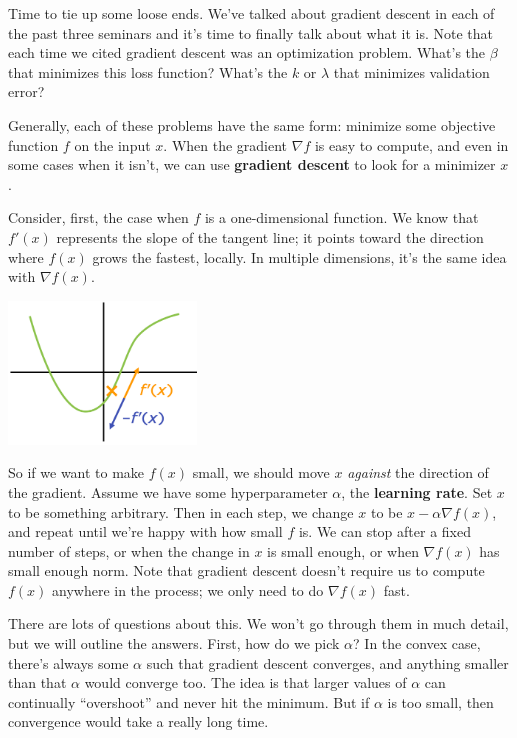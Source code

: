 \documentclass[11pt,paper=letter]{scrartcl}
\begin{document}
Time to tie up some loose ends. We've talked about gradient descent in each of the past three seminars and it's time to finally talk about what it is. Note that each time we cited gradient descent was an optimization problem. What's the $\beta$ that minimizes this loss function? What's the $k$ or $\lambda$ that minimizes validation error?

Generally, each of these problems have the same form: minimize some objective function $f$ on the input $x$. When the gradient $\nabla f$ is easy to compute, and even in some cases when it isn't, we can use \textbf{gradient descent} to look for a minimizer $x$.

Consider, first, the case when $f$ is a one-dimensional function. We know that $f'(x)$ represents the slope of the tangent line; it points toward the direction where $f(x)$ grows the fastest, locally. In multiple dimensions, it's the same idea with $\nabla f(x)$.

\begin{center}
  \includegraphics[height=1.5in]{23.png}
\end{center}

So if we want to make $f(x)$ small, we should move $x$ \textit{against} the direction of the gradient. Assume we have some hyperparameter $\alpha$, the \textbf{learning rate}. Set $x$ to be something arbitrary. Then in each step, we change $x$ to be $x - \alpha \nabla f(x)$, and repeat until we're happy with how small $f$ is. We can stop after a fixed number of steps, or when the change in $x$ is small enough, or when $\nabla f(x)$ has small enough norm. Note that gradient descent doesn't require us to compute $f(x)$ anywhere in the process; we only need to do $\nabla f(x)$ fast.

There are lots of questions about this. We won't go through them in much detail, but we will outline the answers. First, how do we pick $\alpha$? In the convex case, there's always some $\alpha$ such that gradient descent converges, and anything smaller than that $\alpha$ would converge too. The idea is that larger values of $\alpha$ can continually ``overshoot'' and never hit the minimum. But if $\alpha$ is too small, then convergence would take a really long time.
\end{document}
